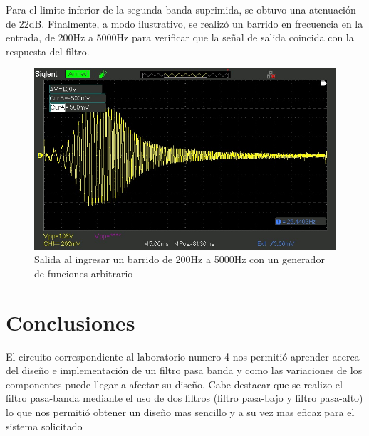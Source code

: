Para el limite inferior de la segunda banda suprimida, se obtuvo una atenuación de 22dB. Finalmente, a modo ilustrativo, se realizó un barrido en frecuencia en la entrada, de 200Hz a 5000Hz para verificar que la señal de salida coincida con la respuesta del filtro.

\begin{figure}[H]
    \centering
    \includegraphics[width=0.75\linewidth]{figuras/SDS00037.jpg}
    \caption{Salida al ingresar un barrido de 200Hz a 5000Hz con un generador de funciones arbitrario}
    \label{fig:enter-label}
\end{figure}


\section{Conclusiones}
\hspace{1mm} El circuito correspondiente al laboratorio numero 4 nos permitió aprender acerca del diseño e implementación de un filtro pasa banda y como las variaciones de los componentes puede llegar a afectar su diseño. Cabe destacar que se realizo el filtro pasa-banda mediante el uso de dos filtros (filtro pasa-bajo y filtro pasa-alto) lo que nos permitió obtener un diseño mas sencillo y a su vez mas eficaz para el sistema solicitado



